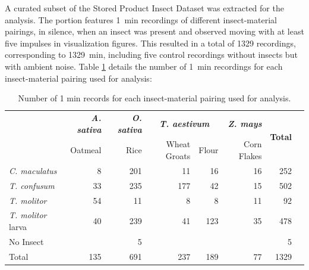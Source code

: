 \documentclass[../Vibro-Acoustic Signatures and Detection Algorithms for Stored Product Insects.tex]{subfiles}
\begin{document}
A curated subset of the Stored Product Insect Dataset was extracted for the analysis. The portion features \SI{1}{\minute} recordings of different insect-material pairings, in silence, when an insect was present and observed moving with at least five impulses in visualization figures. This resulted in a total of 1329 recordings, corresponding to \SI{1329}{\minute}, including five control recordings without insects but with ambient noise. Table \ref{tab:subset} details the number of \SI{1}{\minute} recordings for each insect-material pairing used for analysis:

\begin{table}[!htbp]
	\caption[Description of subset used for analysis]{Number of 1 min records for each insect-material pairing used for analysis. \label{tab:subset}}
	\centering
	\small
	\begin{tabular}{@{}l*{7}{r}@{}}
		\toprule
		                          & \textbf{\textit{A. sativa}} & \textbf{\textit{O. sativa}} & \multicolumn{2}{c}{\textbf{\textit{T. aestivum}}} & \textbf{\textit{Z. mays}} & \multirow{2}{*}{\textbf{Total}}        \\
		                          & Oatmeal                     & Rice                        & Wheat Groats                                      & Flour                     & Corn Flakes                     &      \\
		\midrule
		\textit{C. maculatus}     & 8                           & 201                         & 11                                                & 16                        & 16                              & 252  \\
		\textit{T. confusum}      & 33                          & 235                         & 177                                               & 42                        & 15                              & 502  \\
		\textit{T. molitor}       & 54                          & 11                          & 8                                                 & 8                         & 11                              & 92   \\
		\textit{T. molitor} larva & 40                          & 239                         & 41                                                & 123                       & 35                              & 478  \\
		\midrule
		No Insect                 &                             & 5                           &                                                   &                           &                                 & 5    \\
		\midrule
		Total                     & 135                         & 691                         & 237                                               & 189                       & 77                              & 1329 \\ \bottomrule
	\end{tabular}
\end{table}
\end{document}
